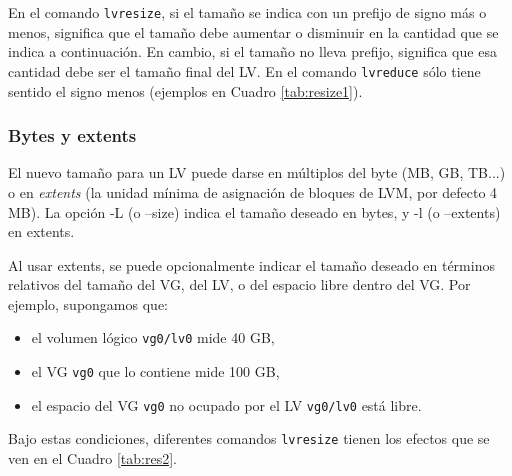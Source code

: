 En el comando \lstinline$lvresize$, si el tamaño se indica con un prefijo de signo más o menos, significa que el tamaño debe aumentar o disminuir en la cantidad que se indica a continuación. En cambio, si el tamaño no lleva prefijo, significa que esa cantidad debe ser el tamaño final del LV. En el comando \lstinline$lvreduce$ sólo tiene sentido el signo menos (ejemplos en Cuadro \ref{tab:resize1}).





\subsubsection {Bytes y extents}
El nuevo tamaño para un LV puede darse en múltiplos del byte (MB, GB, TB...) o en \emph{extents} (la unidad mínima de asignación de bloques de LVM, por defecto 4 MB). La opción -L (o --size) indica el tamaño deseado en bytes, y -l (o --extents) en extents.

Al usar extents, se puede opcionalmente indicar el tamaño deseado en términos relativos del tamaño del VG, del LV, o del espacio libre dentro del VG. Por ejemplo, supongamos que:

\begin{itemize}
	\item el volumen lógico \lstinline$vg0/lv0$ mide 40 GB, 
	\item el VG \lstinline$vg0$ que lo contiene mide 100 GB, 
	\item el espacio del VG \lstinline$vg0$ no ocupado por el LV \lstinline$vg0/lv0$ está libre.
\end{itemize}


Bajo estas condiciones, diferentes comandos \lstinline$lvresize$ tienen los efectos que se ven en el Cuadro \ref{tab:res2}.

